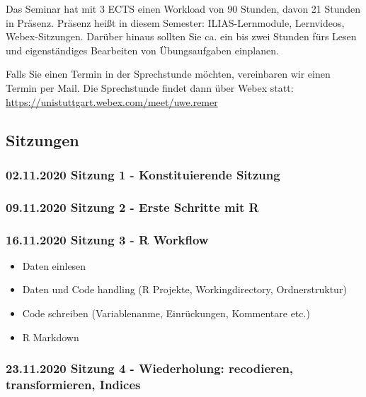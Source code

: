 \documentclass[
]{article}
\providecommand{\tightlist}{%
  \setlength{\itemsep}{0pt}\setlength{\parskip}{0pt}}
\begin{document}
Das Seminar hat mit 3 ECTS einen Workload von 90 Stunden, davon 21
Stunden in Präsenz. Präsenz heißt in diesem Semester: ILIAS-Lernmodule,
Lernvideos, Webex-Sitzungen. Darüber hinaus sollten Sie ca. ein bis zwei
Stunden fürs Lesen und eigenständiges Bearbeiten von Übungsaufgaben
einplanen.

Falls Sie einen Termin in der Sprechstunde möchten, vereinbaren wir
einen Termin per Mail. Die Sprechstunde findet dann über Webex statt:
\url{https://unistuttgart.webex.com/meet/uwe.remer}

\hypertarget{sitzungen}{%
\subsection{Sitzungen}\label{sitzungen}}

\hypertarget{sitzung-1---konstituierende-sitzung}{%
\subsubsection{02.11.2020 Sitzung 1 - Konstituierende
Sitzung}\label{sitzung-1---konstituierende-sitzung}}

\hypertarget{sitzung-2---erste-schritte-mit-r}{%
\subsubsection{09.11.2020 Sitzung 2 - Erste Schritte mit
R}\label{sitzung-2---erste-schritte-mit-r}}

\hypertarget{sitzung-3---r-workflow}{%
\subsubsection{16.11.2020 Sitzung 3 - R
Workflow}\label{sitzung-3---r-workflow}}

\begin{itemize}
\tightlist
\item
  Daten einlesen
\item
  Daten und Code handling (R Projekte, Workingdirectory, Ordnerstruktur)
\item
  Code schreiben (Variablenanme, Einrückungen, Kommentare etc.)
\item
  R Markdown
\end{itemize}

\hypertarget{sitzung-4---wiederholung-recodieren-transformieren-indices}{%
\subsubsection{23.11.2020 Sitzung 4 - Wiederholung: recodieren,
transformieren,
Indices}\label{sitzung-4---wiederholung-recodieren-transformieren-indices}}
\end{document}
